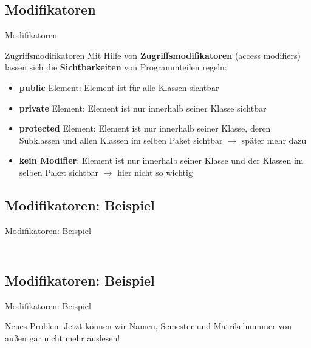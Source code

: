 \documentclass[usepdftitle=false,hyperref={pdfpagelabels=false}]{beamer}
\begin{document}
\subsection{Modifikatoren}
\begin{frame}{Modifikatoren}
  \begin{block}{Zugriffsmodifikatoren}
    Mit Hilfe von \textbf{Zugriffsmodifikatoren} (access modifiers) lassen sich die
    \textbf{Sichtbarkeiten} von Programmteilen regeln:
    \begin{itemize}
        \item \textbf{public} Element: Element ist für alle Klassen sichtbar
        \item<2-> \textbf{private} Element: Element ist nur innerhalb seiner Klasse sichtbar
        \item<3-> \textbf{protected} Element: Element ist nur innerhalb seiner Klasse, deren
              Subklassen und allen Klassen im selben Paket sichtbar
              $\rightarrow$ später mehr dazu
        \item<4-> \textbf{kein Modifier}: Element ist nur innerhalb seiner Klasse und der
              Klassen im selben Paket sichtbar
              $\rightarrow$ hier nicht so wichtig
    \end{itemize}
  \end{block}
\end{frame}

\subsection{Modifikatoren: Beispiel}
\begin{frame}{Modifikatoren: Beispiel}
  \inputminted[linenos=true, numbersep=5pt, tabsize=4, fontsize=\tiny, frame=lines, label=Student.java, firstline=1, lastline=10]{java}{Visibility.java}
  \inputminted[linenos=true, numbersep=5pt, tabsize=4, fontsize=\tiny, frame=lines, label=Main.java, firstline=12, lastline=19]{java}{Visibility.java}
\end{frame}

\subsection{Modifikatoren: Beispiel}
\begin{frame}{Modifikatoren: Beispiel}
  \begin{alertblock}{Neues Problem}
    Jetzt können wir Namen, Semester und Matrikelnummer von außen gar nicht mehr
    auslesen!
  \end{alertblock}
\end{frame}
\end{document}
